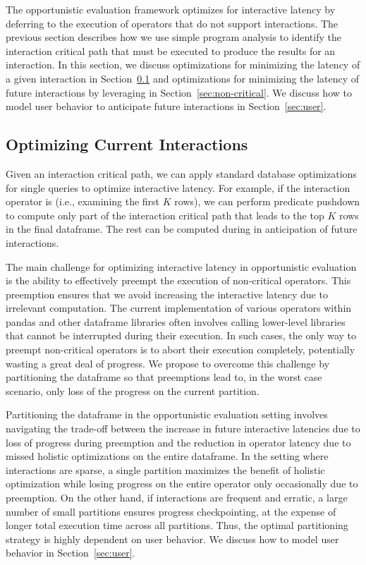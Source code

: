 The opportunistic evaluation framework optimizes for interactive latency by deferring to \thinktime the execution of operators that do not support interactions. The previous section describes how we use simple program analysis to identify the interaction critical path that must be executed to produce the results for an interaction. In this section, we discuss optimizations for minimizing the latency of a given interaction in Section~\ref{sec:critical} and optimizations for minimizing the latency of future interactions by leveraging \thinktime in Section~\ref{sec:non-critical}. We discuss how to model user behavior to anticipate future interactions in Section~\ref{sec:user}.


\subsection{Optimizing Current Interactions}
\label{sec:critical}

Given an interaction critical path, we can apply standard database optimizations for single queries to optimize interactive latency. For example, if the interaction operator is  (i.e., examining the first $K$ rows), we can perform predicate pushdown to compute only part of the interaction critical path that leads to the top $K$ rows in the final dataframe. The rest can be computed during \thinktime in anticipation of future interactions. 


The main challenge for optimizing interactive latency in opportunistic evaluation is the ability to effectively preempt the execution of non-critical operators. This preemption ensures that we avoid increasing the interactive latency due to irrelevant computation. 
The current implementation of various operators within pandas and other dataframe libraries often involves calling lower-level libraries that cannot be interrupted during their execution. In such cases, the only way to preempt non-critical operators is to abort their execution completely, potentially wasting a great deal of progress. We propose to overcome this challenge by partitioning the dataframe so that preemptions lead to, in the worst case scenario, only loss of the progress on the current partition.

Partitioning the dataframe in the opportunistic evaluation setting involves navigating the trade-off between the increase in future interactive latencies due to loss of progress during preemption and the reduction in operator latency due to missed holistic optimizations on the entire dataframe. In the setting where interactions are sparse, a single partition maximizes the benefit of holistic optimization while losing progress on the entire operator only occasionally due to preemption. On the other hand, if interactions are frequent and erratic, a large number of small partitions ensures progress checkpointing, at the expense of longer total execution time across all partitions. Thus, the optimal partitioning strategy is highly dependent on user behavior. We discuss how to model user behavior in Section~\ref{sec:user}.

